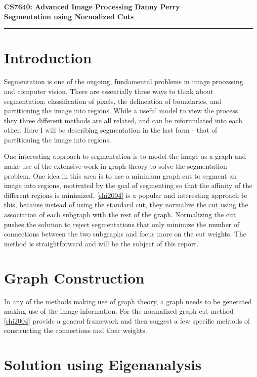 \documentclass[11pt]{article}
\begin{document}
\thispagestyle{empty}
{\large{\bf CS7640: Advanced Image Processing \hfill Danny Perry}}\\

{\LARGE{\bf Segmentation using Normalized Cuts}}
\vspace{0.2\baselineskip}
\hrule

\section{Introduction}
Segmentation is one of the ongoing, fundamental problems in image processing and computer vision. 
There are essentially three ways to think about segmentation: classification of pixels, the delineation of boundaries, and partitioning the image into regions.
While a useful model to view the process, they three different methods are all related, and can be reformulated into each other.
Here I will be describing segmentation in the last form - that of partitioning the image into regions.

One interesting approach to segmentation is to model the image as a graph and make use of the extensive work in graph theory to solve the segmentation problem.
One idea in this area is to use a minimum graph cut to segment an image into regions, motivated by the goal of segmenting so that the affinity of the different regions is minimized.
\ref{shi2004} is a popular and interesting approach to this, because instead of using the standard cut, they normalize the cut using the association of each subgraph with the rest of the graph.
Normalizing the cut pushes the solution to reject segmentations that only minimize the number of connections between the two subgraphs and focus more on the cut weights.
The method is straightforward and will be the subject of this report.

\section{Graph Construction}

In any of the methods making use of graph theory, a graph needs to be generated making use of the image information.
For the normalized graph cut method \ref{shi2004} provide a general framework and then suggest a few specific mehtods of constructing the connections and their weights.

\section{Solution using Eigenanalysis}
\end{document}
